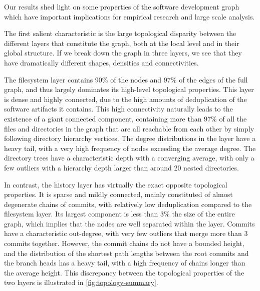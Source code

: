 Our results shed light on some properties of the software development graph
which have important implications for empirical research and large scale
analysis.

The first salient characteristic is the large topological disparity between the
different layers that constitute the graph, both at the local level and in
their global structure. If we break down the graph in three layers, we see that
they have dramatically different shapes, densities and connectivities.

The filesystem layer contains 90\% of the nodes and 97\% of the edges of the
full graph, and thus largely dominates its high-level topological properties.
This layer is dense and highly connected, due to the high amounts of
deduplication of the software artifacts it contains. This high connectivity
naturally leads to the existence of a giant connected component, containing
more than 97\% of all the files and directories in the graph that are all
reachable from each other by simply following directory hierarchy vertices.
The degree distributions in the layer have a heavy tail, with a very high
frequency of nodes exceeding the average degree.
The directory trees have a characteristic depth with a converging average, with
only a few outliers with a hierarchy depth larger than around 20 nested
directories.

In contrast, the history layer has virtually the exact opposite topological
properties. It is sparse and mildly connected, mainly constituted of almost
degenerate chains of commits, with relatively low deduplication compared to the
filesystem layer. Its largest component is less than 3\% the size of the entire
graph, which implies that the nodes are well separated within the layer.
Commits have a characteristic out-degree, with very few outliers that merge
more than 3 commits together. However, the commit chains do not have a bounded
height, and the distribution of the shortest path lengths between the root
commits and the branch heads has a heavy tail, with a high frequency of chains
longer than the average height. This discrepancy between the topological
properties of the two layers is illustrated in \cref{fig:topology-summary}.

